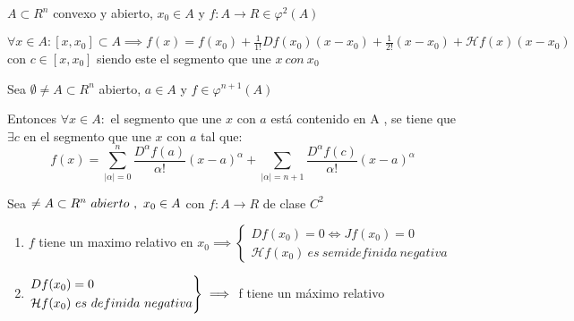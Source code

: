 \begin{nth}

$A \subset R^n$ convexo  y abierto, $x_0 \in A$ y $f:A \to R\in \varphi^2(A)$

$\forall x \in A : [x,x_0] \subset A \implies f(x) = f(x_0) + \frac{1}{1!}Df(x_0)(x-x_0)+ \frac{1}{2!}(x-x_0) + \mathcal{H}f(x)(x-x_0)$ con $c \in [x,x_0]$ siendo este el segmento que une $x \ con \ x_0$

\end{nth}

\begin{nth}
Sea $\emptyset \ne A \subset R^{n}$ abierto, $a\in A$ y $f \in \varphi^{n+1}(A)$

Entonces $\forall x \in A :$ el segmento que une $x$ con $a$ está contenido en A , se tiene que $\exists c $ en el segmento que une $x$ con $a$ tal que:
\[
f(x) = \sum_{|\alpha| = 0}^n \frac{D^\alpha f(a)}{\alpha !}(x-a)^\alpha + \sum_{|\alpha| = n+1}\frac{D^\alpha f(c)}{\alpha !}(x-a)^\alpha
\]


\end{nth}

\begin{nth}
Sea $\empty \ne A \subset R^n \ abierto \ , \ x_0 \in A$ con $f:A \to R$ de clase $C^2$
\begin{enumerate}
	\item $f$ tiene un maximo relativo en $x_0 \implies \begin{cases}
	Df(x_0) = 0 \iff Jf(x_0) = 0\\
	\mathcal{H}f(x_0) \ es \ semidefinida \ negativa
\end{cases}$

\item $\begin{rcases}
	Df(x_0) = 0\\
	\mathcal{H}f(x_0) \ es \ definida \ negativa
\end{rcases} \implies $ f tiene un máximo relativo
\end{enumerate}
\end{nth}

